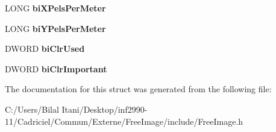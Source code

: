 \begin{DoxyCompactItemize}
\item 
L\+O\+NG {\bfseries bi\+X\+Pels\+Per\+Meter}\hypertarget{structtag_b_i_t_m_a_p_i_n_f_o_h_e_a_d_e_r_ae363738b6e92248a7be41f4e7ed55c54}{}\label{structtag_b_i_t_m_a_p_i_n_f_o_h_e_a_d_e_r_ae363738b6e92248a7be41f4e7ed55c54}

\item 
L\+O\+NG {\bfseries bi\+Y\+Pels\+Per\+Meter}\hypertarget{structtag_b_i_t_m_a_p_i_n_f_o_h_e_a_d_e_r_ac6226594275d045ff0d03849945d920f}{}\label{structtag_b_i_t_m_a_p_i_n_f_o_h_e_a_d_e_r_ac6226594275d045ff0d03849945d920f}

\item 
D\+W\+O\+RD {\bfseries bi\+Clr\+Used}\hypertarget{structtag_b_i_t_m_a_p_i_n_f_o_h_e_a_d_e_r_adbf6bd52839895672030a734d2ae752f}{}\label{structtag_b_i_t_m_a_p_i_n_f_o_h_e_a_d_e_r_adbf6bd52839895672030a734d2ae752f}

\item 
D\+W\+O\+RD {\bfseries bi\+Clr\+Important}\hypertarget{structtag_b_i_t_m_a_p_i_n_f_o_h_e_a_d_e_r_a637282b108fc8ac3bdf41479f9931ccb}{}\label{structtag_b_i_t_m_a_p_i_n_f_o_h_e_a_d_e_r_a637282b108fc8ac3bdf41479f9931ccb}

\end{DoxyCompactItemize}


The documentation for this struct was generated from the following file\+:\begin{DoxyCompactItemize}
\item 
C\+:/\+Users/\+Bilal Itani/\+Desktop/inf2990-\/11/\+Cadriciel/\+Commun/\+Externe/\+Free\+Image/include/Free\+Image.\+h\end{DoxyCompactItemize}
